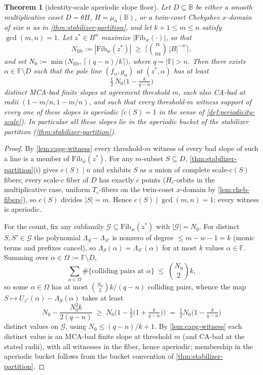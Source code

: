 \documentclass[11pt]{article}
\newtheorem{theorem}{Theorem}[section]
\theoremstyle{definition}
\theoremstyle{remark}
\newcommand{\F}{\mathbb{F}}
\newcommand{\B}{\mathbb{B}}
\begin{document}
\begin{theorem}[identity-scale aperiodic slope floor]\label{thm:capg-aperiodic-floor}
Let $D\subseteq\B$ be either a smooth multiplicative coset
$D=\theta H$, $H=\mu_n(\B)$, or a twin-coset Chebyshev $x$-domain of
size $n$ as in \cref{thm:stabilizer-partition}, and let
$k+1\leq m\leq n$ satisfy $\gcd(m,n)=1$.  Let
$z^{*}\in B^{w}$ maximize $|\mathrm{Fib}_w(\cdot)|$, so that
\[
N_{\mathrm{fib}}:=|\mathrm{Fib}_w(z^{*})|\;\geq\;
\Big\lceil \binom{n}{m}\,|B|^{-w}\Big\rceil ,
\]
and set $N_0:=\min\big(N_{\mathrm{fib}},\,\lceil (q-n)/k\rceil\big)$, where
$q=|\F|>n$.  Then there exists $\alpha\in\F\setminus D$ such that the pole
line $(f_\alpha,g_\alpha)$ at $(z^{*},\alpha)$ has at least
\[
\tfrac12\,N_0\Big(1-\tfrac{k}{q-n}\Big)
\]
distinct MCA-bad finite slopes at agreement threshold $m$, each also CA-bad
at radii $(1-m/n,1-m/n)$, and such that \emph{every} threshold-$m$ witness
support of every one of these slopes is aperiodic ($c(S)=1$ in the sense of
\cref{def:periodicity-scale}).  In particular all these slopes lie in the
aperiodic bucket of the stabilizer partition
(\cref{thm:stabilizer-partition}).
\end{theorem}

\begin{proof}
By \cref{lem:capg-witness} every threshold-$m$ witness of every bad slope of
such a line is a member of $\mathrm{Fib}_w(z^{*})$.  For any $m$-subset
$S\subseteq D$, \cref{thm:stabilizer-partition}\textup{(i)} gives
$c(S)\mid n$ and exhibits $S$ as a union of complete scale-$c(S)$ fibers;
every scale-$c$ fiber of $D$ has exactly $c$ points ($H_c$-orbits in the
multiplicative case, uniform $T_c$-fibers on the twin-coset $x$-domain by
\cref{lem:cheb-fibers}), so $c(S)$ divides $|S|=m$.  Hence
$c(S)\mid\gcd(m,n)=1$: every witness is aperiodic.

For the count, fix any subfamily
$\mathcal{G}\subseteq\mathrm{Fib}_w(z^{*})$ with $|\mathcal{G}|=N_0$.  For
distinct $S,S'\in\mathcal{G}$ the polynomial $\Lambda_S-\Lambda_{S'}$ is
nonzero of degree $\leq m-w-1=k$ (monic terms and prefixes cancel), so
$\Lambda_S(\alpha)=\Lambda_{S'}(\alpha)$ for at most $k$ values
$\alpha\in\F$.  Summing over $\alpha\in\Omega:=\F\setminus D$,
\[
\sum_{\alpha\in\Omega}\#\{\text{colliding pairs at }\alpha\}
\;\leq\;\binom{N_0}{2}k,
\]
so some $\alpha\in\Omega$ has at most $\binom{N_0}{2}k/(q-n)$ colliding
pairs, whence the map $S\mapsto U_{z^*}(\alpha)-\Lambda_S(\alpha)$ takes at
least
\[
N_0-\frac{N_0^{2}k}{2(q-n)}\;\geq\;
N_0\Big(1-\tfrac12\big(1+\tfrac{k}{q-n}\big)\Big)
\;=\;\tfrac12 N_0\Big(1-\tfrac{k}{q-n}\Big)
\]
distinct values on $\mathcal{G}$, using
$N_0\leq (q-n)/k+1$.  By \cref{lem:capg-witness} each distinct value is an
MCA-bad finite slope at threshold $m$ (and CA-bad at the stated radii), with
all witnesses in the fiber, hence aperiodic; membership in the aperiodic
bucket follows from the bucket convention of
\cref{thm:stabilizer-partition}.
\end{proof}
\end{document}
